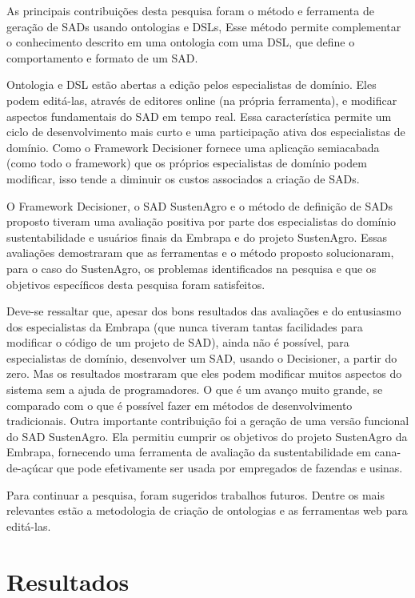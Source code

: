 As principais contribuições desta pesquisa foram o método e ferramenta
de geração de SADs usando ontologias e \foreignlanguage{english}{DSLs},
Esse método permite complementar o conhecimento descrito em uma ontologia
com uma DSL, que define o comportamento e formato de um SAD. 

Ontologia e DSL estão abertas a edição pelos especialistas de domínio.
Eles podem editá-las, através de editores online (na própria ferramenta),
e modificar aspectos fundamentais do SAD em tempo real. Essa característica
permite um ciclo de desenvolvimento mais curto e uma participação
ativa dos especialistas de domínio. Como o Framework Decisioner fornece
uma aplicação semiacabada (como todo o framework) que os próprios
especialistas de domínio podem modificar, isso tende a diminuir os
custos associados a criação de SADs. 

O Framework Decisioner, o SAD SustenAgro e o método de definição de
SADs proposto tiveram uma avaliação positiva por parte dos especialistas
do domínio sustentabilidade e usuários finais da Embrapa e do projeto
SustenAgro. Essas avaliações demostraram que as ferramentas e o método
proposto solucionaram, para o caso do SustenAgro, os problemas identificados
na pesquisa e que os objetivos específicos desta pesquisa foram satisfeitos.

Deve-se ressaltar que, apesar dos bons resultados das avaliações e
do entusiasmo dos especialistas da Embrapa (que nunca tiveram tantas
facilidades para modificar o código de um projeto de SAD), ainda não
é possível, para especialistas de domínio, desenvolver um SAD, usando
o Decisioner, a partir do zero. Mas os resultados mostraram que eles
podem modificar muitos aspectos do sistema sem a ajuda de programadores.
O que é um avanço muito grande, se comparado com o que é possível
fazer em métodos de desenvolvimento tradicionais. Outra importante
contribuição foi a geração de uma versão funcional do SAD SustenAgro.
Ela permitiu cumprir os objetivos do projeto SustenAgro da Embrapa,
fornecendo uma ferramenta de avaliação da sustentabilidade em cana-de-açúcar
que pode efetivamente ser usada por empregados de fazendas e usinas.

Para continuar a pesquisa, foram sugeridos trabalhos futuros. Dentre
os mais relevantes estão a metodologia de criação de ontologias e
as ferramentas web para editá-las.


\section{Resultados}

